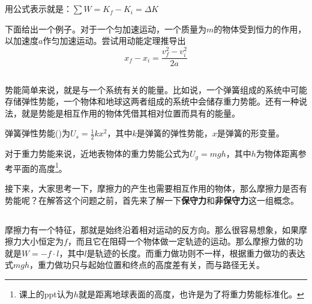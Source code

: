 \section[能量守恒]{}
\subsection[动能定理复习]{}
\begin{Itemize}
    \item {}
\end{Itemize}
用公式表示就是：$\sum W=K_{f}-K_{i}=\Delta K$

下面给出一个例子。对于一个匀加速运动，一个质量为$m$的物体受到恒力的作用，以加速度$a$作匀加速运动。尝试用动能定理推导出
\[x_{f}-x_{i}=\frac{v_{f}^{2}-v_{i}^{2}}{2a}\]
\subsection[势能]{}
势能简单来说，就是与一个系统有关的能量。比如说，一个弹簧组成的系统中可能存储弹性势能，一个物体和地球这两者组成的系统中会储存重力势能。还有一种说法，就是势能是相互作用的物体凭借其相对位置而具有的能量。

弹簧弹性势能()为$U_{s}=\frac{1}{2}kx^{2}$，其中$k$是弹簧的弹性势能，$x$是弹簧的形变量。

对于重力势能来说，近地表物体的重力势能公式为$U_{g}=mgh$，其中$h$为物体距离参考平面的高度\footnote{课上的ppt认为$h$就是距离地球表面的高度，也许是为了将重力势能标准化。}。

接下来，大家思考一下，摩擦力的产生也需要相互作用的物体，那么摩擦力是否有势能呢？在解答这个问题之前，首先来了解一下\textbf{保守力}和\textbf{非保守力}这一组概念。
\subsection[保守力与非保守力]{}
摩擦力有一个特征，那就是始终沿着相对运动的反方向。那么很容易想象，如果摩擦力大小恒定为$f$，而且它在阻碍一个物体做一定轨迹的运动。那么摩擦力做的功就是$W=-f\cdot l$，其中$l$是轨迹的长度。而重力做功则不一样，根据重力做功的表达式$mgh$，重力做功只与起始位置和终点的高度差有关，而与路径无关。

